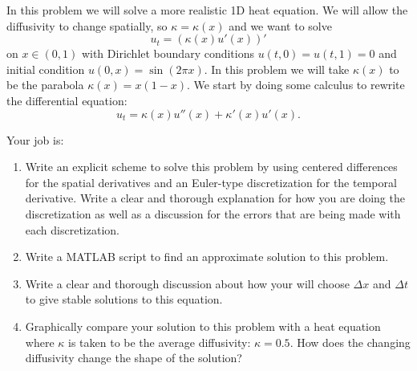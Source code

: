 \begin{problem}
    In this problem we will solve a more realistic 1D heat equation.  We will allow the
    diffusivity to change spatially, so $\kappa = \kappa(x)$ and we want to solve
    \[ u_t = \left( \kappa(x) u'(x) \right)' \]
    on $x \in (0,1)$ with Dirichlet boundary conditions $u(t,0) = u(t,1) = 0$ and initial
    condition $u(0,x) = \sin(2 \pi x)$. In this problem we will take $\kappa(x)$ to be the
    parabola $\kappa(x)= x(1-x)$. We start by doing some calculus to rewrite the
    differential equation:
    \[ u_t = \kappa(x) u''(x) + \kappa'(x) u'(x). \]

    Your job is:
    \begin{enumerate}
        \item Write an explicit scheme to solve this problem by using centered differences
            for the spatial derivatives and an Euler-type discretization for the temporal
            derivative.  Write a clear and thorough explanation for how you are doing the
            discretization as well as a discussion for the errors that are being made with
            each discretization.
        \item Write a MATLAB script to find an approximate solution to this problem.
        \item Write a clear and thorough discussion about how your will choose $\Delta x$
            and $\Delta t$ to give stable solutions to this equation.
        \item Graphically compare your solution to this problem with a heat equation where
            $\kappa$ is taken to be the average diffusivity: $\kappa = 0.5.$  How does the
            changing diffusivity change the shape of the solution?
    \end{enumerate}

\end{problem}



